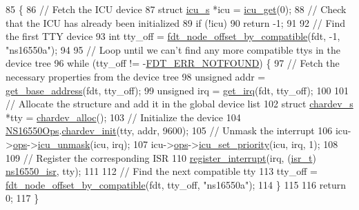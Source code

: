 \begin{DoxyCode}
85 \{
86     \textcolor{comment}{// Fetch the ICU device}
87     \textcolor{keyword}{struct }\hyperlink{structicu__s}{icu\_s} *icu = \hyperlink{icu_8h_a8ea2773b171799420c4542ff4e3bac3c}{icu\_get}(0);
88     \textcolor{comment}{// Check that the ICU has already been initialized}
89     \textcolor{keywordflow}{if} (!icu)
90         \textcolor{keywordflow}{return} -1;
91 
92     \textcolor{comment}{// Find the first TTY device}
93     \textcolor{keywordtype}{int} tty\_off = \hyperlink{fdt__ro_8c_a7fee20e876e2af4dd32e987c6c8f104a}{fdt\_node\_offset\_by\_compatible}(fdt, -1, \textcolor{stringliteral}{"ns16550a"});
94 
95     \textcolor{comment}{// Loop until we can't find any more compatible ttys in the device tree}
96     \textcolor{keywordflow}{while} (tty\_off != -\hyperlink{libfdt_8h_a93cfa052f4b28df4bfc7d336b692fa07}{FDT\_ERR\_NOTFOUND}) \{
97         \textcolor{comment}{// Fetch the necessary properties from the device tree}
98         \textcolor{keywordtype}{unsigned} addr = \hyperlink{qemu-virt-riscv_2soc_8c_a8f32c2785fa3edd070abdaa34c96f6a7}{get\_base\_address}(fdt, tty\_off);
99         \textcolor{keywordtype}{unsigned} irq = \hyperlink{qemu-virt-riscv_2soc_8c_a7bd21ef4af7971db5dad06231290d8d1}{get\_irq}(fdt, tty\_off);
100 
101         \textcolor{comment}{// Allocate the structure and add it in the global device list}
102         \textcolor{keyword}{struct }\hyperlink{structchardev__s}{chardev\_s} *tty = \hyperlink{chardev_8h_a0f9abac4f27deb18dd30410b33ba7e72}{chardev\_alloc}();
103         \textcolor{comment}{// Initialize the device}
104         \hyperlink{ns16550_8c_a0ee065bfc31437abc862a858a0c0e641}{NS16550Ops}.\hyperlink{structchardev__ops__s_acde8ff309c1553a2209756737f2b2d31}{chardev\_init}(tty, addr, 9600);
105         \textcolor{comment}{// Unmask the interrupt}
106         icu->\hyperlink{structicu__s_a7f989a94a922fa1c782cfcf7547bd8c5}{ops}->\hyperlink{structicu__ops__s_a4aee28cc809733a67481e782c1efd1fa}{icu\_unmask}(icu, irq);
107         icu->\hyperlink{structicu__s_a7f989a94a922fa1c782cfcf7547bd8c5}{ops}->\hyperlink{structicu__ops__s_a1f08d353530f63d1877f160fd70fcdfd}{icu\_set\_priority}(icu, irq, 1);
108 
109         \textcolor{comment}{// Register the corresponding ISR}
110         \hyperlink{kirq_8c_a7bb6fb99500c6f10708c7653cef722e8}{register\_interrupt}(irq, (\hyperlink{kirq_8h_a6c476c213249d7236d7888257e71628d}{isr\_t}) \hyperlink{ns16550_8c_ae454489b1aed9bb4342ee26403d4ee93}{ns16550\_isr}, tty);
111 
112         \textcolor{comment}{// Find the next compatible tty}
113         tty\_off = \hyperlink{fdt__ro_8c_a7fee20e876e2af4dd32e987c6c8f104a}{fdt\_node\_offset\_by\_compatible}(fdt, tty\_off, \textcolor{stringliteral}{"ns16550a"});
114     \}
115 
116     \textcolor{keywordflow}{return} 0;
117 \}
\end{DoxyCode}

